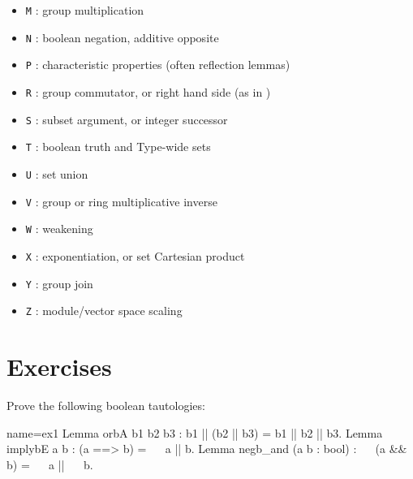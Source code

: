 \begin{itemize}
\begin{itemize}
\begin{itemize}
    \item {\tt M} : group multiplication
    \item {\tt N} : boolean negation, additive opposite
    \item {\tt P} : characteristic properties (often reflection
      lemmas)
    \item {\tt R} : group commutator, or right hand side (as in
      )
    \item {\tt S} : subset argument, or integer successor
    \item {\tt T} : boolean truth and Type-wide sets
    \item {\tt U} : set union
    \item {\tt V} : group or ring multiplicative inverse
    \item {\tt W} : weakening
    \item {\tt X} : exponentiation, or set Cartesian product
    \item {\tt Y} : group join
    \item {\tt Z} : module/vector space scaling
    \end{itemize}
  \end{itemize}
\end{itemize}


%
%


\newpage
\section{Exercises}

\begin{Exercise}[label=ex:boolid,difficulty=0,title={Truth tables}]

Prove the following boolean tautologies:

\begin{coq}{name=ex1}{}
Lemma orbA b1 b2 b3 : b1 || (b2 || b3) = b1 || b2 || b3.
Lemma implybE a b : (a ==> b) = ~~ a || b.
Lemma negb_and (a b : bool) : ~~ (a && b) = ~~ a || ~~ b.
\end{coq}

\end{Exercise}

